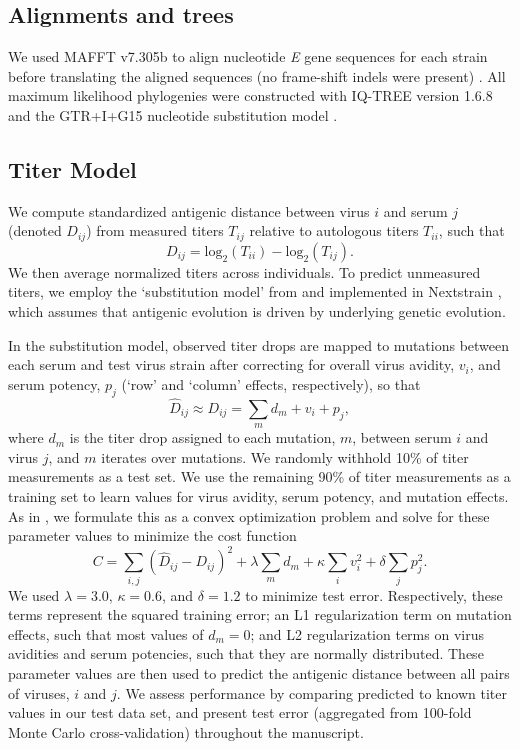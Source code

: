 \documentclass[11pt,oneside,letterpaper]{article}
\begin{document}
\subsection*{Alignments and trees}
We used MAFFT v7.305b to align nucleotide \textit{E} gene sequences for each strain before translating the aligned sequences (no frame-shift indels were present) \citep{katoh2013mafft}.
All maximum likelihood phylogenies were constructed with IQ-TREE version 1.6.8 and the GTR+I+G15 nucleotide substitution model \citep{nguyen2014iq}.

\subsection*{Titer Model}
We compute standardized antigenic distance between virus $i$ and serum $j$ (denoted $D_{ij}$) from measured titers $T_{ij}$ relative to autologous titers $T_{ii}$, such that
\begin{equation}
  \label{eq_titer_norm}
D_{ij} = \mathrm{log}_2(T_{ii}) - \mathrm{log}_2(T_{ij}).
\end{equation}
We then average normalized titers across individuals.
To predict unmeasured titers, we employ the `substitution model' from \citet{neher2016prediction} and implemented in Nextstrain \citep{hadfield2018nextstrain}, which assumes that antigenic evolution is driven by underlying genetic evolution.

In the substitution model, observed titer drops are mapped to mutations between each serum and test virus strain after correcting for overall virus avidity, $v_i$, and serum potency, $p_j$ (`row' and `column' effects, respectively), so that
\begin{equation}
  \label{eq_predicted_titers}
\hat{D}_{ij} \approx D_{ij} = \sum_{m} d_m + v_i + p_j,
\end{equation}
where $d_m$ is the titer drop assigned to each mutation, $m$, between serum $i$ and virus $j$, and $m$ iterates over mutations.
We randomly withhold 10\% of titer measurements as a test set.
We use the remaining 90\% of titer measurements as a training set to learn values for virus avidity, serum potency, and mutation effects.
As in \citet{neher2016prediction}, we formulate this as a convex optimization problem and solve for these parameter values to minimize the cost function
\begin{equation}
  \label{eq_cost_fn}
C = \sum_{i,j} (\hat{D}_{ij} - D_{ij})^2 + \lambda \sum_{m} d_m + \kappa \sum_{i} v_i^2 + \delta \sum_{j} p_j^2.
\end{equation}
We used $\lambda = 3.0$, $\kappa = 0.6$, and $\delta = 1.2$ to minimize test error.
Respectively, these terms represent the squared training error; an L1 regularization term on mutation effects, such that most values of $d_m = 0$; and L2 regularization terms on virus avidities and serum potencies, such that they are normally distributed.
These parameter values are then used to predict the antigenic distance between all pairs of viruses, $i$ and $j$.
We assess performance by comparing predicted to known titer values in our test data set, and present test error (aggregated from 100-fold Monte Carlo cross-validation) throughout the manuscript.
\end{document}
